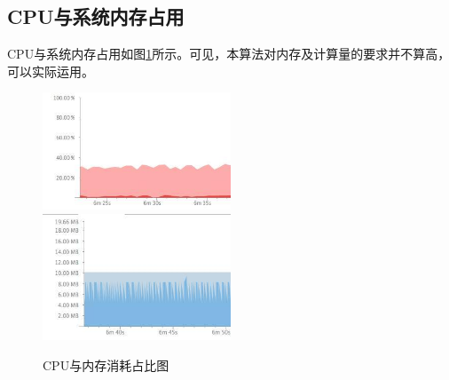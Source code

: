 \documentclass{XDBAthesis}
\begin{document}
\subsection{CPU与系统内存占用}
CPU与系统内存占用如图\ref{fg:2}所示。可见，本算法对内存及计算量的要求并不算高，可以实际运用。
\begin{figure}[htb]
    \centering
    \includegraphics[width=0.5\textwidth ]{figure/cpu}%
    \includegraphics[width=0.5\textwidth ]{figure/memory}
    \caption{CPU与内存消耗占比图}
    \label{fg:2}
\end{figure}
\end{document}
